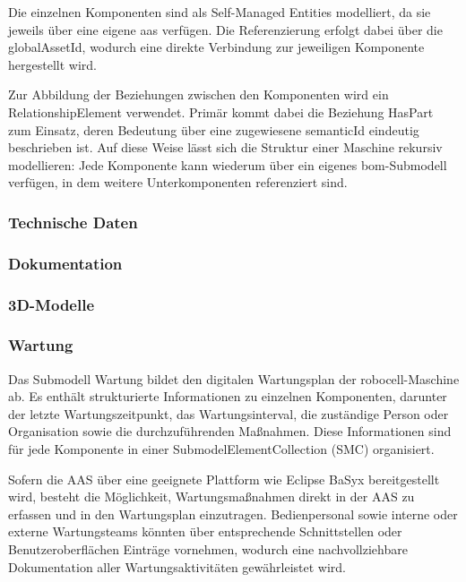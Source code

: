 Die einzelnen Komponenten sind als Self-Managed Entities modelliert, da sie jeweils über eine eigene \acs{aas} verfügen.
Die Referenzierung erfolgt dabei über die globalAssetId, wodurch eine direkte Verbindung zur jeweiligen Komponente hergestellt wird.

Zur Abbildung der Beziehungen zwischen den Komponenten wird ein RelationshipElement verwendet.
Primär kommt dabei die Beziehung HasPart zum Einsatz, deren Bedeutung über eine zugewiesene semanticId eindeutig beschrieben ist.
Auf diese Weise lässt sich die Struktur einer Maschine rekursiv modellieren: Jede Komponente kann wiederum über ein eigenes \acs{bom}-Submodell verfügen, in dem weitere Unterkomponenten referenziert sind.

\subsubsection*{Technische Daten}
\vspace{-0.5em}

\subsubsection*{Dokumentation}
\vspace{-0.5em}

\subsubsection*{3D-Modelle}
\vspace{-0.5em}

\subsubsection*{Wartung}
\vspace{-0.5em}
Das Submodell Wartung bildet den digitalen Wartungsplan der robocell-Maschine ab. 
Es enthält strukturierte Informationen zu einzelnen Komponenten, darunter der letzte Wartungszeitpunkt, das Wartungsinterval, die zuständige Person oder Organisation sowie die durchzuführenden Maßnahmen. 
Diese Informationen sind für jede Komponente in einer SubmodelElementCollection (SMC) organisiert.

Sofern die AAS über eine geeignete Plattform wie Eclipse BaSyx bereitgestellt wird, besteht die Möglichkeit, Wartungsmaßnahmen direkt in der AAS zu erfassen und in den Wartungsplan einzutragen. 
Bedienpersonal sowie interne oder externe Wartungsteams könnten über entsprechende Schnittstellen oder Benutzeroberflächen Einträge vornehmen, wodurch eine nachvollziehbare Dokumentation aller Wartungsaktivitäten gewährleistet wird.

